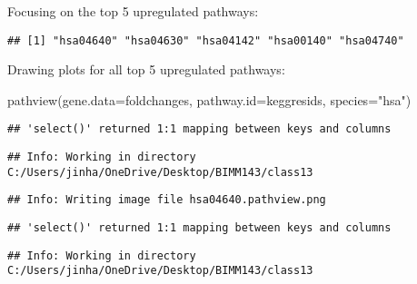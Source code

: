 \documentclass[
]{article}
\newenvironment{Shaded}{\begin{snugshade}}{\end{snugshade}}
\newcommand{\AttributeTok}[1]{\textcolor[rgb]{0.77,0.63,0.00}{#1}}
\newcommand{\DecValTok}[1]{\textcolor[rgb]{0.00,0.00,0.81}{#1}}
\newcommand{\FunctionTok}[1]{\textcolor[rgb]{0.00,0.00,0.00}{#1}}
\newcommand{\NormalTok}[1]{#1}
\newcommand{\OtherTok}[1]{\textcolor[rgb]{0.56,0.35,0.01}{#1}}
\newcommand{\SpecialCharTok}[1]{\textcolor[rgb]{0.00,0.00,0.00}{#1}}
\newcommand{\StringTok}[1]{\textcolor[rgb]{0.31,0.60,0.02}{#1}}
\begin{document}
Focusing on the top 5 upregulated pathways:

\begin{Shaded}
\end{Shaded}

\begin{verbatim}
## [1] "hsa04640" "hsa04630" "hsa04142" "hsa00140" "hsa04740"
\end{verbatim}

Drawing plots for all top 5 upregulated pathways:

\begin{Shaded}
\begin{Highlighting}[]
\FunctionTok{pathview}\NormalTok{(}\AttributeTok{gene.data=}\NormalTok{foldchanges, }\AttributeTok{pathway.id=}\NormalTok{keggresids, }\AttributeTok{species=}\StringTok{"hsa"}\NormalTok{)}
\end{Highlighting}
\end{Shaded}

\begin{verbatim}
## 'select()' returned 1:1 mapping between keys and columns
\end{verbatim}

\begin{verbatim}
## Info: Working in directory C:/Users/jinha/OneDrive/Desktop/BIMM143/class13
\end{verbatim}

\begin{verbatim}
## Info: Writing image file hsa04640.pathview.png
\end{verbatim}

\begin{verbatim}
## 'select()' returned 1:1 mapping between keys and columns
\end{verbatim}

\begin{verbatim}
## Info: Working in directory C:/Users/jinha/OneDrive/Desktop/BIMM143/class13
\end{verbatim}
\end{document}

